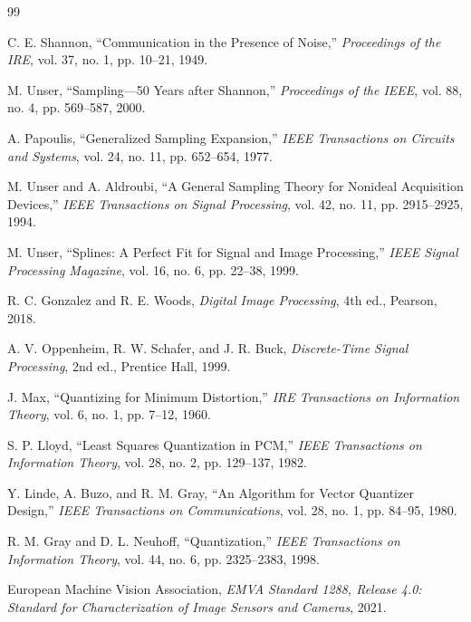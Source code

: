 \documentclass[12pt,openany,oneside]{book}
\begin{document}
\backmatter
\renewcommand{\bibname}{منابع علمی، استانداردها و مقالات فصل دوم}
\begin{thebibliography}{99}
\begin{LTR}

C. E. Shannon,
``Communication in the Presence of Noise,''
\emph{Proceedings of the IRE}, vol. 37, no. 1, pp. 10--21, 1949.

M. Unser,
``Sampling---50 Years after Shannon,''
\emph{Proceedings of the IEEE}, vol. 88, no. 4, pp. 569--587, 2000.

A. Papoulis,
``Generalized Sampling Expansion,''
\emph{IEEE Transactions on Circuits and Systems}, vol. 24, no. 11, pp. 652--654, 1977.

M. Unser and A. Aldroubi,
``A General Sampling Theory for Nonideal Acquisition Devices,''
\emph{IEEE Transactions on Signal Processing}, vol. 42, no. 11, pp. 2915--2925, 1994.

M. Unser,
``Splines: A Perfect Fit for Signal and Image Processing,''
\emph{IEEE Signal Processing Magazine}, vol. 16, no. 6, pp. 22--38, 1999.

R. C. Gonzalez and R. E. Woods,
\emph{Digital Image Processing}, 4th ed., Pearson, 2018.

A. V. Oppenheim, R. W. Schafer, and J. R. Buck,
\emph{Discrete-Time Signal Processing}, 2nd ed., Prentice Hall, 1999.

J. Max,
``Quantizing for Minimum Distortion,''
\emph{IRE Transactions on Information Theory}, vol. 6, no. 1, pp. 7--12, 1960.

S. P. Lloyd,
``Least Squares Quantization in PCM,''
\emph{IEEE Transactions on Information Theory}, vol. 28, no. 2, pp. 129--137, 1982.

Y. Linde, A. Buzo, and R. M. Gray,
``An Algorithm for Vector Quantizer Design,''
\emph{IEEE Transactions on Communications}, vol. 28, no. 1, pp. 84--95, 1980.

R. M. Gray and D. L. Neuhoff,
``Quantization,''
\emph{IEEE Transactions on Information Theory}, vol. 44, no. 6, pp. 2325--2383, 1998.

European Machine Vision Association,
\emph{EMVA Standard 1288, Release 4.0: Standard for Characterization of Image Sensors and Cameras}, 2021.


\end{LTR}
\end{thebibliography}
\end{document}
